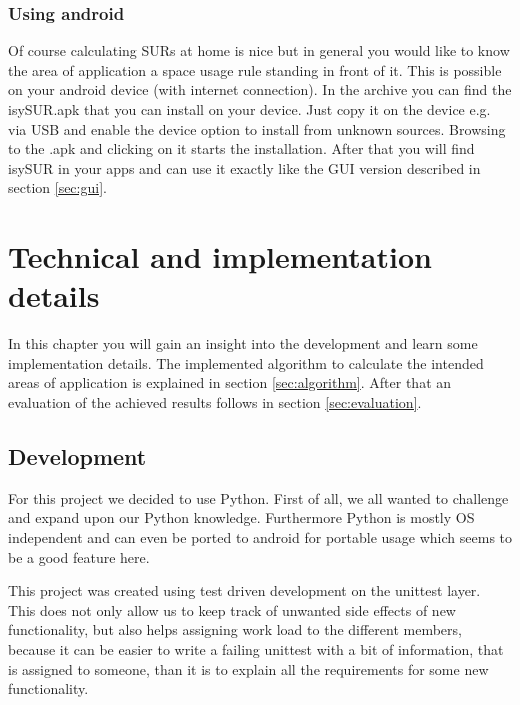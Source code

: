 \documentclass[11pt,fleqn]{book} %
\newcommand{\todol}{\todo[inline]} %
\begin{document}
\subsection{Using android}\label{sec:android}
Of course calculating SURs at home is nice but in general you would like to know the area of application a space usage rule standing in front of it. This is possible on your android device (with internet connection). In the archive you can find the isySUR.apk that you can install on your device. Just copy it on the device e.g. via USB and enable the device option to install from unknown sources. Browsing to the .apk and clicking on it starts the installation. After that you will find isySUR in your apps and can use it exactly like the GUI version described in section \ref{sec:gui}.


\chapter{Technical and implementation details}
In this chapter you will gain an insight into the development and learn some implementation details. The implemented algorithm to calculate the intended areas of application is explained in section \ref{sec:algorithm}. After that an evaluation of the achieved results follows in section \ref{sec:evaluation}.

\todol{Code documentation -> pydoc?}

\section{Development}
For this project we decided to use Python. First of all, we all wanted to challenge and expand upon our Python knowledge. Furthermore Python is mostly OS independent and can even be ported to android for portable usage which seems to be a good feature here.

This project was created using test driven development on the unittest layer. This does not only allow us to keep track of unwanted side effects of new functionality, but also helps assigning work load to the different members, because it can be easier to write a failing unittest with a bit of information, that is assigned to someone, than it is to explain all the requirements for some new functionality.
\end{document}
